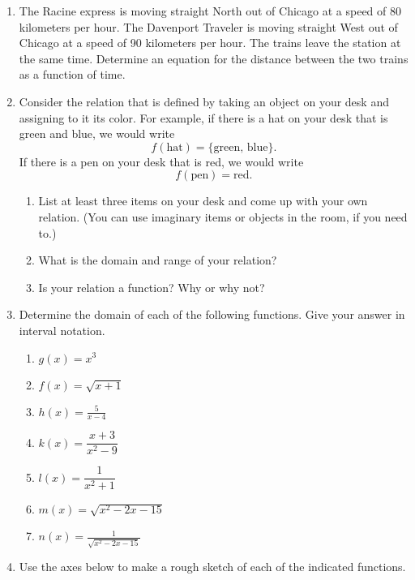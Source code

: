 
\begin{enumerate}
\item The Racine express is moving straight North out of Chicago at a
  speed of 80 kilometers per hour. The Davenport Traveler is moving
  straight West out of Chicago at a speed of 90 kilometers per
  hour. The trains leave the station at the same time. Determine an
  equation for the distance between the two trains as a function of
  time.

\item Consider the relation that is defined by taking an object on
  your desk and assigning to it its color.  For example, if there is a
  hat on your desk that is green and blue, we would write
  $$f(\text{hat}) = \{\text{green, blue}\}.$$
  If there is a pen on your desk that is red, we would write
  $$f(\text{pen}) = \text{red}.$$
\begin{enumerate}
\item List at least three items on your desk and come up with your own
  relation. (You can use imaginary items or objects in the room, if
  you need to.)
\item What is the domain and range of your relation?
\item Is your relation a function?  Why or why not?
\end{enumerate}

\item Determine the domain of each of the following functions. Give your answer in interval notation.%
\begin{enumerate}
\item $g(x) = x^3$
\item $f(x)=\sqrt{x+1}$
\item $h(x)=\frac{5}{x-4}$
\item $k(x) = \dfrac{x+3}{x^2-9}$
\item $l(x)=\dfrac{1}{x^2+1}$
\item $m(x) = \sqrt{x^2-2x-15}$
\item $n(x) = \frac{1}{\sqrt{x^2-2x-15}}$
\end{enumerate}

\item Use the axes below to make a rough sketch of each of the
  indicated functions.
  \pagebreak[4]
  \begin{enumerate}


\end{enumerate}
\end{enumerate}
